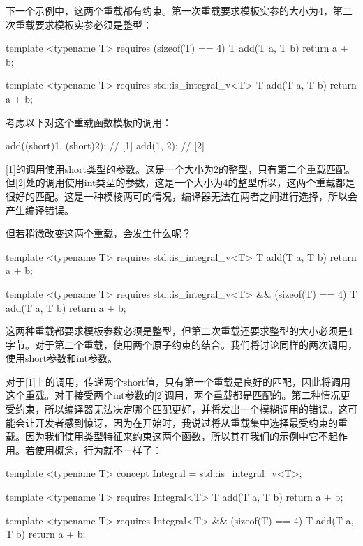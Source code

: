 下一个示例中，这两个重载都有约束。第一次重载要求模板实参的大小为4，第二次重载要求模板实参必须是整型：

\begin{cpp}
template <typename T>
requires (sizeof(T) == 4)
T add(T a, T b)
{
	return a + b;
}

template <typename T>
requires std::is_integral_v<T>
T add(T a, T b)
{
	return a + b;
}
\end{cpp}

考虑以下对这个重载函数模板的调用：

\begin{cpp}
add((short)1, (short)2); // [1]
add(1, 2); // [2]
\end{cpp}

[1]的调用使用short类型的参数。这是一个大小为2的整型，只有第二个重载匹配。但[2]处的调用使用int类型的参数，这是一个大小为4的整型所以，这两个重载都是很好的匹配。这是一种模棱两可的情况，编译器无法在两者之间进行选择，所以会产生编译错误。

但若稍微改变这两个重载，会发生什么呢？

\begin{cpp}
template <typename T>
requires std::is_integral_v<T>
T add(T a, T b)
{
	return a + b;
}

template <typename T>
requires std::is_integral_v<T> && (sizeof(T) == 4)
T add(T a, T b)
{
	return a + b;
}
\end{cpp}

这两种重载都要求模板参数必须是整型，但第二次重载还要求整型的大小必须是4字节。对于第二个重载，使用两个原子约束的结合。我们将讨论同样的两次调用，使用short参数和int参数。

对于[1]上的调用，传递两个short值，只有第一个重载是良好的匹配，因此将调用这个重载。对于接受两个int参数的[2]调用，两个重载都是匹配的。第二种情况更受约束，所以编译器无法决定哪个匹配更好，并将发出一个模糊调用的错误。这可能会让开发者感到惊讶，因为在开始时，我说过将从重载集中选择最受约束的重载。因为我们使用类型特征来约束这两个函数，所以其在我们的示例中它不起作用。若使用概念，行为就不一样了：

\begin{cpp}
template <typename T>
concept Integral = std::is_integral_v<T>;

template <typename T>
requires Integral<T>
T add(T a, T b)
{
	return a + b;
}

template <typename T>
requires Integral<T> && (sizeof(T) == 4)
T add(T a, T b)
{
	return a + b;
}
\end{cpp}

